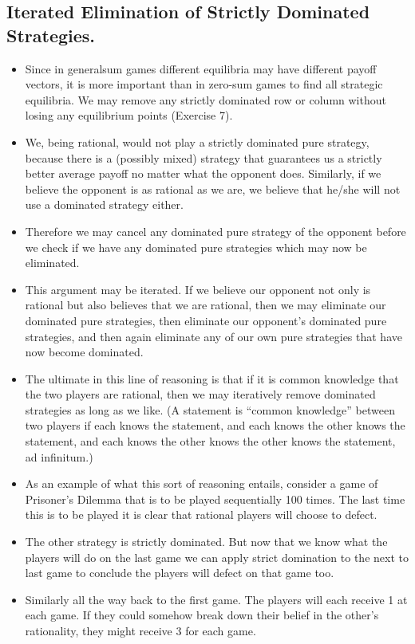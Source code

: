 \documentclass{article}
\begin{document}
\subsection{Iterated Elimination of Strictly Dominated Strategies.}
\begin{itemize}
    \item Since in generalsum
games different equilibria may have different payoff vectors, it is more important than
in zero-sum games to find all strategic equilibria. We may remove any strictly dominated
row or column without losing any equilibrium points (Exercise 7).
\item We, being rational, would not play a strictly dominated pure strategy, because there
is a (possibly mixed) strategy that guarantees us a strictly better average payoff no matter
what the opponent does. Similarly, if we believe the opponent is as rational as we are, we
believe that he/she will not use a dominated strategy either.
\item Therefore we may cancel any
dominated pure strategy of the opponent before we check if we have any dominated pure
strategies which may now be eliminated.
\item This argument may be iterated. If we believe our opponent not only is rational but
also believes that we are rational, then we may eliminate our dominated pure strategies,
then eliminate our opponent’s dominated pure strategies, and then again eliminate any
of our own pure strategies that have now become dominated. 
\item The ultimate in this line
of reasoning is that if it is common knowledge that the two players are rational, then we
may iteratively remove dominated strategies as long as we like. (A statement is “common
knowledge” between two players if each knows the statement, and each knows the other
knows the statement, and each knows the other knows the other knows the statement, ad
infinitum.)
\item As an example of what this sort of reasoning entails, consider a game of Prisoner’s
Dilemma that is to be played sequentially 100 times. The last time this is to be played it is
clear that rational players will choose to defect. 
\item The other strategy is strictly dominated.
But now that we know what the players will do on the last game we can apply strict
domination to the next to last game to conclude the players will defect on that game too.
\item Similarly all the way back to the first game. The players will each receive 1 at each game.
If they could somehow break down their belief in the other’s rationality, they might receive
3 for each game.

\end{itemize}
\end{document}
